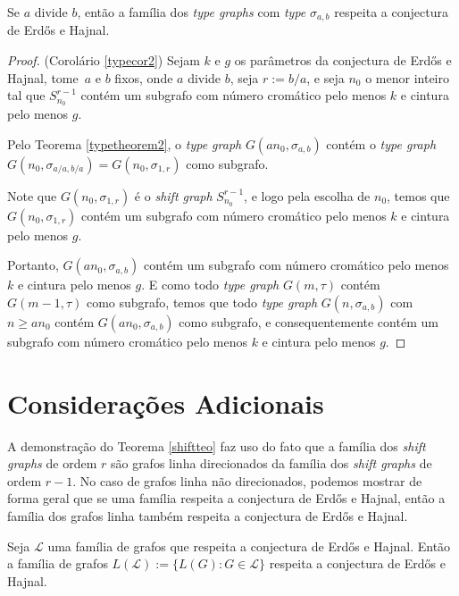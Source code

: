\begin{corolario}\label{typecor2}
Se $a$ divide $b$, então a família dos \textit{type graphs} com \textit{type} $\sigma_{a,b}$ respeita a conjectura de Erd\H{o}s e Hajnal.
\end{corolario}

\begin{proof}(Corolário \ref{typecor2})
Sejam $k$ e $g$ os parâmetros da conjectura de Erd\H{o}s e Hajnal, tome~$a$ e $b$ fixos, onde $a$ divide $b$, seja $r:= b/a$, e seja $n_0$ o menor inteiro tal que $S_{n_0}^{r-1}$ contém um subgrafo com número cromático pelo menos $k$ e cintura pelo menos $g$.

Pelo Teorema \ref{typetheorem2}, o \textit{type graph} $G(an_0, \sigma_{a,b})$ contém o \textit{type graph} $G(n_0, \sigma_{a/a,b/a}) = G(n_0,\sigma_{1,r})$ como subgrafo.

Note que $G(n_0,\sigma_{1,r})$ é o \textit{shift graph} $S_{n_0}^{r-1}$, e logo pela escolha de $n_0$, temos que $G(n_0,\sigma_{1,r})$ contém um subgrafo com número cromático pelo menos $k$ e cintura pelo menos $g$.

Portanto, $G(an_0, \sigma_{a,b})$ contém um subgrafo com número cromático pelo menos $k$ e cintura pelo menos $g$. E como todo \textit{type graph} $G(m,\tau)$ contém $G(m-1,\tau)$ como subgrafo, temos que todo \textit{type graph} $G(n,\sigma_{a,b})$ com $n \geq an_0$ contém $G(an_0, \sigma_{a,b})$ como subgrafo, e consequentemente contém um subgrafo com número cromático pelo menos $k$ e cintura pelo menos $g$.
\end{proof}

\section{Considerações Adicionais}

A demonstração do Teorema \ref{shiftteo} faz uso do fato que a família dos \textit{shift graphs} de ordem $r$ são grafos linha direcionados da família dos \textit{shift graphs} de ordem $r-1$. No caso de grafos linha não direcionados, podemos mostrar de forma geral que se uma família respeita a conjectura de Erd\H{o}s e Hajnal, então a família dos grafos linha também respeita a conjectura de Erd\H{o}s e Hajnal.

\begin{fato}\label{shiftconsfinal1}
Seja $\mathcal{L}$ uma família de grafos que respeita a conjectura de Erd\H{o}s e Hajnal. Então a família de grafos $L(\mathcal{L}) := \{L(G) : G\in\mathcal{L}\}$ respeita a conjectura de Erd\H{o}s e Hajnal.
\end{fato}

